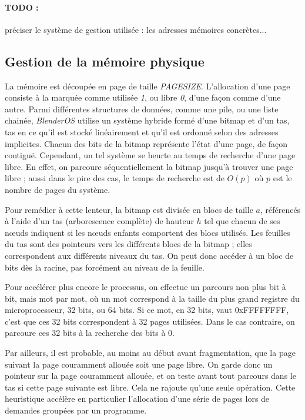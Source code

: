 \documentclass{article}
\begin{document}
\paragraph*{TODO : } préciser le système de gestion utilisée : les adresses mémoires concrètes...\\

\subsection{Gestion de la mémoire physique}
  La mémoire est découpée en page de taille \emph{PAGESIZE}. L'allocation d'une page consiste à la marquée comme utilisée \emph{1}, ou libre \emph{0}, d'une façon comme d'une autre. Parmi différentes structures de données, comme une pile, ou une liste chainée, \emph{BlenderOS} utilise un système hybride formé d'une bitmap et d'un tas, tas en ce qu'il est stocké linéairement et qu'il est ordonné selon des adresses implicites. Chacun des bits de la bitmap représente l'état d'une page, de façon contiguë.
Cependant, un tel système se heurte au temps de recherche d'une page libre. En effet, on parcoure séquentiellement la bitmap jusqu'à trouver une page libre ; aussi dans le pire des cas, le temps de recherche est de $O(p)$ où $p$ est le nombre de pages du système. 

  Pour remédier à cette lenteur, la bitmap est divisée en blocs de taille $a$, référencés à l'aide d'un tas (arborescence complète) de hauteur $h$ tel que chacun de ses nœuds indiquent si les nœuds enfants comportent des blocs utilisés. 
Les feuilles du tas sont des pointeurs vers les différents blocs de la bitmap ; elles correspondent aux différents niveaux du tas. On peut donc accéder à un bloc de bits dès la racine, pas forcément au niveau de la feuille.

Pour accélérer plus encore le processus, on effectue un parcours non plus bit à bit, mais mot par mot, où un mot correspond à la taille du plus grand registre du microprocesseur, 32 bits, ou 64 bits. Si ce mot, en 32 bits, vaut 0xFFFFFFFF, c'est que ces 32 bits correspondent à 32 pages utilisées. Dans le cas contraire, on parcoure ces 32 bits à la recherche des bits à 0.

  Par ailleurs, il est probable, au moins au début avant fragmentation, que la page suivant la page couramment allouée soit une page libre. On garde donc un pointeur sur la page couramment allouée, et on teste avant tout parcours dans le tas si cette page suivante est libre. Cela ne rajoute qu'une seule opération. Cette heuristique accélère en particulier l'allocation d'une série de pages lors de demandes groupées par un programme.
  
\end{document}
